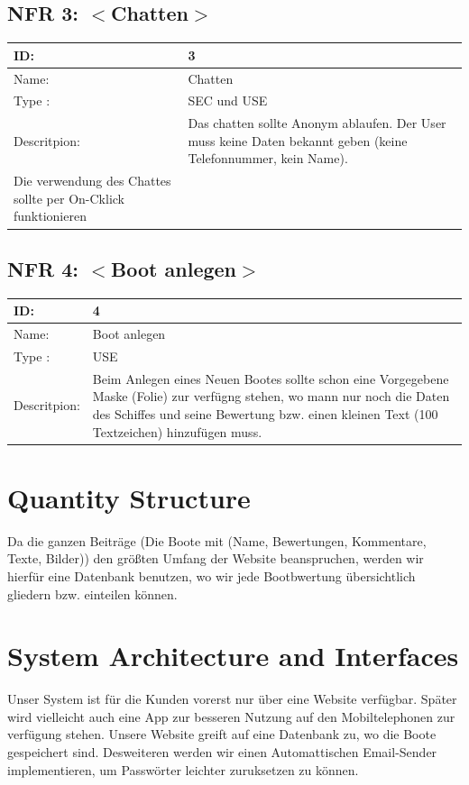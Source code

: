 \documentclass[12pt]{article}
\theoremstyle{definition}
\newenvironment{explanation}{%
   \setlength{\parindent}{0pt}
   \itshape
   \color{blue}
}{}
\begin{document}
\subsection{NFR 3: $<$Chatten$>$}
\begin{tabular}{|p{.2\linewidth}|p{.65\linewidth}|}
\hline 
ID: & 3 \\ \hline
Name: & Chatten \\ \hline
Type	: & SEC und USE \\ \hline
Descritpion: &  Das chatten sollte Anonym ablaufen. Der User muss keine Daten bekannt geben (keine Telefonnummer, kein Name). \\Die verwendung des Chattes sollte per On-Cklick funktionieren \\ \hline
\end{tabular}

\subsection{NFR 4: $<$Boot anlegen$>$}
\begin{tabular}{|p{.2\linewidth}|p{.65\linewidth}|}
\hline 
ID: & 4 \\ \hline
Name: & Boot anlegen \\ \hline
Type	: & USE \\ \hline
Descritpion: &  Beim Anlegen eines Neuen Bootes sollte schon eine Vorgegebene Maske (Folie) zur verfügng stehen, wo mann nur noch die Daten des Schiffes und seine Bewertung bzw. einen kleinen Text (100 Textzeichen) hinzufügen muss.\\ \hline
\end{tabular}
\pagebreak

\section{Quantity Structure}
\begin{explanation}
Da die ganzen Beiträge (Die Boote mit (Name, Bewertungen, Kommentare, Texte, Bilder)) den größten Umfang der Website beanspruchen, werden wir hierfür eine Datenbank benutzen, wo wir jede Bootbwertung übersichtlich gliedern bzw. einteilen können.
\end{explanation}

\pagebreak
\section{System Architecture and Interfaces}
\begin{explanation}
Unser System ist für die Kunden vorerst nur über eine Website verfügbar. Später wird vielleicht auch eine App zur besseren Nutzung auf den Mobiltelephonen zur verfügung stehen. Unsere Website greift auf eine Datenbank zu, wo die Boote gespeichert sind. Desweiteren werden wir einen Automattischen Email-Sender implementieren, um Passwörter leichter zuruksetzen zu können.
\end{explanation}
\end{document}
